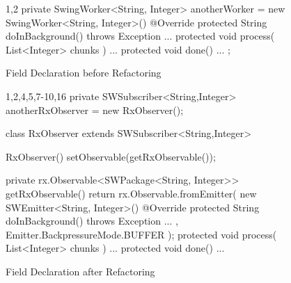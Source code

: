 \begin{figure}[H]
\begin{minipage}{0.48\textwidth}
\begin{sourcecode}
\begin{javacode}{1,2}
private SwingWorker<String, Integer> anotherWorker 
	= new SwingWorker<String, Integer>(){
	@Override
	protected String doInBackground() throws Exception
	{
		...
	}
	protected void process( List<Integer> chunks ) {...}
	protected void done() {...}
};
\end{javacode}
\caption{Field Declaration before Refactoring}
\label{code:fd-before}
\end{sourcecode}
\end{minipage}\hspace{0.7cm}
\begin{minipage}{0.48\textwidth}
\begin{sourcecode}
\begin{javacode}{1,2,4,5,7-10,16}
private SWSubscriber<String,Integer> anotherRxObserver 
	= new RxObserver();

class RxObserver extends SWSubscriber<String,Integer>{
	RxObserver(){ setObservable(getRxObservable()); }

	private rx.Observable<SWPackage<String, Integer>> 
		getRxObservable() {
		return rx.Observable.fromEmitter( 
			new SWEmitter<String, Integer>() {
				@Override
				protected String doInBackground() 
				throws Exception {
					...
				}
		}, Emitter.BackpressureMode.BUFFER );
	}
	protected void process( List<Integer> chunks ) {...}
	protected void done() {...}
}
\end{javacode}
\caption{Field Declaration after Refactoring}
\label{code:fd-after}
\end{sourcecode}
\end{minipage}
\end{figure}